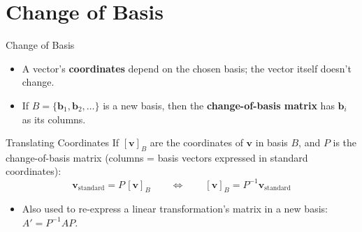\documentclass[9pt,aspectratio=169]{beamer}
\newcommand{\vect}[1]{\mathbf{#1}}
\begin{document}
\section{Change of Basis}

\begin{frame}{Change of Basis}
\begin{itemize}
\item A vector's \textbf{coordinates} depend on the chosen basis; the vector itself doesn't change.
\item If $B = \{\vect{b}_1, \vect{b}_2, \dots\}$ is a new basis, then the \textbf{change-of-basis matrix} has $\vect{b}_i$ as its columns.
\end{itemize}
\begin{block}{Translating Coordinates}
If $[\vect{v}]_B$ are the coordinates of $\vect{v}$ in basis $B$, and $P$ is the change-of-basis matrix (columns = basis vectors expressed in standard coordinates):
$$\vect{v}_{\text{standard}} = P\,[\vect{v}]_B \qquad \Longleftrightarrow \qquad [\vect{v}]_B = P^{-1}\vect{v}_{\text{standard}}$$
\end{block}
\begin{itemize}
\item Also used to re-express a linear transformation's matrix in a new basis: $A' = P^{-1}AP$.
\end{itemize}
\end{frame}
\end{document}
